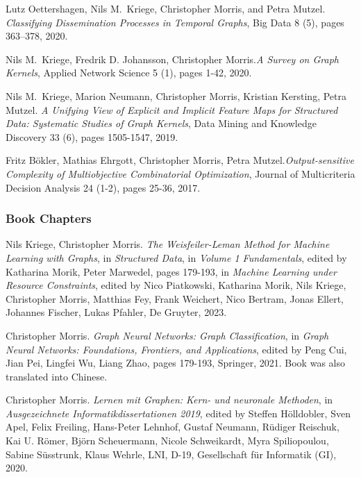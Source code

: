 \documentclass[11pt, a4paper, DIV=12]{scrartcl}
\begin{document}
\begin{thebibliography}{15}
	Lutz Oettershagen, Nils M.~Kriege, Christopher Morris, and Petra Mutzel.
	\emph{Classifying Dissemination Processes in Temporal Graphs},
	Big Data 8 (5), pages 363--378, 2020.

	Nils M.~Kriege,  Fredrik D. Johansson, Christopher Morris.\footnotemark[2]
	\emph{A Survey on Graph Kernels},
	Applied Network Science 5 (1), pages 1-42, 2020.

	Nils M.~Kriege,  Marion Neumann, Christopher Morris, Kristian Kersting, Petra Mutzel.
	\emph{A Unifying View of Explicit and Implicit Feature Maps for Structured Data: Systematic Studies of Graph Kernels},
	Data Mining and Knowledge Discovery 33 (6), pages 1505-1547, 2019.

	Fritz B\"okler, Mathias Ehrgott, Christopher Morris, Petra Mutzel.\footnotemark[1]
	\emph{Output-sensitive Complexity of Multiobjective Combinatorial Optimization},
	Journal of Multicriteria Decision Analysis 24 (1-2), pages 25-36, 2017.

	\subsubsection*{Book Chapters}

	Nils Kriege, Christopher Morris.
	\emph{The Weisfeiler-Leman Method for Machine Learning with Graphs},
	in \emph{Structured Data}, in \emph{Volume 1 Fundamentals}, edited by Katharina Morik, Peter Marwedel, pages 179-193, in \emph{Machine Learning under Resource Constraints},
	edited by Nico Piatkowski, Katharina Morik, Nils Kriege, Christopher Morris, Matthias Fey, Frank Weichert, Nico Bertram, Jonas Ellert, Johannes Fischer, Lukas Pfahler, De Gruyter, 2023.

	Christopher Morris.
	\emph{Graph Neural Networks: Graph Classification},
	in \emph{Graph Neural Networks: Foundations, Frontiers, and Applications}, edited by Peng Cui, Jian Pei, Lingfei Wu, Liang Zhao, pages 179-193, Springer, 2021. Book was also translated into Chinese.

	Christopher Morris.
	\emph{Lernen mit Graphen: Kern- und neuronale Methoden}, in
	\emph{Ausgezeichnete Informatikdissertationen 2019}, edited by Steffen H{\"o}lldobler, Sven Apel, Felix Freiling, Hans-Peter Lehnhof, Gustaf Neumann, R{\"u}diger Reischuk, Kai U. R{\"o}mer, Bj{\"o}rn Scheuermann, Nicole Schweikardt, Myra Spiliopoulou, Sabine S{\"u}sstrunk, Klaus Wehrle, LNI, D-19, Gesellschaft f{\"u}r Informatik (GI), 2020.


\end{thebibliography}
\end{document}
